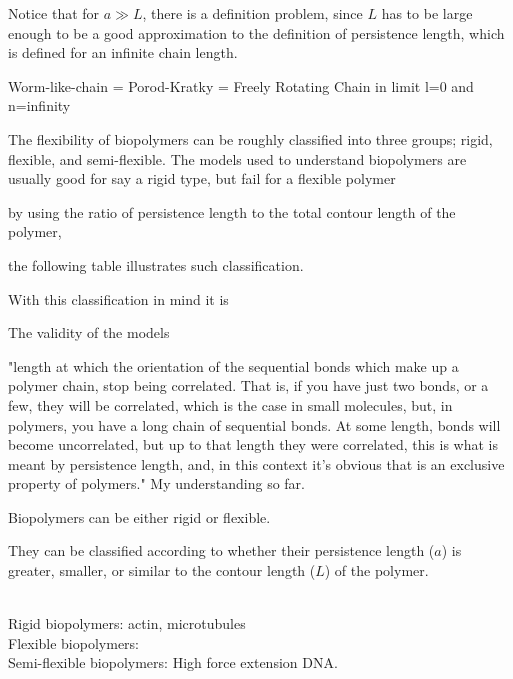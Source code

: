 Notice that for $a \gg L$, there is a definition problem, since $L$
has to be large enough to be a good approximation to the definition of
persistence length, which is defined for an infinite chain length.

Worm-like-chain = Porod-Kratky = Freely Rotating Chain in limit l=0
and n=infinity






The flexibility of biopolymers can be roughly classified into three
groups;  rigid,  flexible,  and  semi-flexible.  The  models  used  to
understand biopolymers are usually good for say a rigid type, but fail
for a flexible polymer

by using the  ratio of persistence length to  the total contour length
of the polymer,


the following table illustrates such classification.



With this classification in mind it is




The validity of the models 





"length at which the orientation of the sequential bonds which make up
a polymer chain, stop being correlated.  That is, if you have just two
bonds, or a  few, they will be correlated, which is  the case in small
molecules,  but, in  polymers, you  have  a long  chain of  sequential
bonds. At some length, bonds  will become uncorrelated, but up to that
length  they were  correlated, this  is what  is meant  by persistence
length,  and,  in this  context  it's  obvious  that is  an  exclusive
property of polymers." My understanding so far.





Biopolymers can be either rigid or flexible. 

They can be classified  according to whether their persistence length ($a$)
is greater, smaller, or similar to the contour length ($L$) of the polymer.


\\

Rigid biopolymers:
actin, microtubules
\\

Flexible biopolymers:
\\

Semi-flexible biopolymers:
High force extension DNA.
\\

